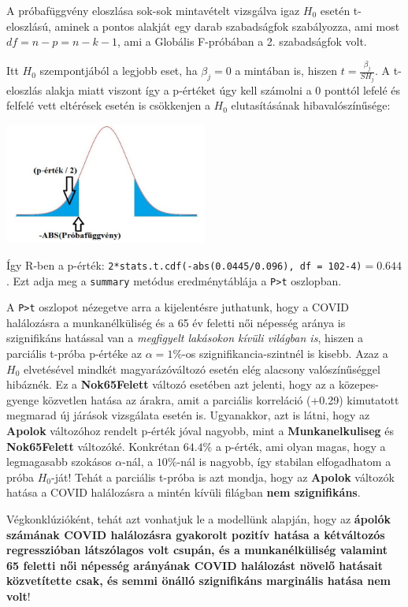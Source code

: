 \documentclass[
]{book}
\begin{document}
A próbafüggvény eloszlása sok-sok mintavételt vizsgálva igaz \(H_0\) esetén t-eloszlású, aminek a pontos alakját egy darab szabadságfok szabályozza, ami most \(df=n-p=n-k-1\), ami a Globális F-próbában a 2. szabadságfok volt.

Itt \(H_0\) szempontjából a legjobb eset, ha \(\beta_j=0\) a mintában is, hiszen \(t=\frac{\beta_j}{SH_j}\). A t-eloszlás alakja miatt viszont így a p-értéket úgy kell számolni a 0 ponttól lefelé és felfelé vett eltérések esetén is csökkenjen a \(H_0\) elutasításának hibavalószínűsége:

\includegraphics[width=0.5\textwidth,height=\textheight]{pt.jpg}

Így R-ben a p-érték: \texttt{2*stats.t.cdf(-abs(0.0445/0.096),\ df\ =\ 102-4)}\(= 0.644\). Ezt adja meg a \texttt{summary} metódus eredménytáblája a \texttt{P\textgreater{}\textbar{}t\textbar{}} oszlopban.

A \texttt{P\textgreater{}\textbar{}t\textbar{}} oszlopot nézegetve arra a kijelentésre juthatunk, hogy a COVID halálozásra a munkanélküliség és a 65 év feletti női népesség aránya is szignifikáns hatással van a \emph{megfigyelt lakásokon kívüli világban is}, hiszen a parciális t-próba p-értéke az \(\alpha=1\%\)-os szignifikancia-szintnél is kisebb. Azaz a \(H_0\) elvetésével mindkét magyarázóváltozó esetén elég alacsony valószínűséggel hibáznék. Ez a \textbf{Nok65Felett} változó esetében azt jelenti, hogy az a közepes-gyenge közvetlen hatása az árakra, amit a parciális korreláció (+0.29) kimutatott megmarad új járások vizsgálata esetén is. Ugyanakkor, azt is látni, hogy az \textbf{Apolok} változóhoz rendelt p-érték jóval nagyobb, mint a \textbf{Munkanelkuliseg} és \textbf{Nok65Felett} változóké. Konkrétan \(64.4\%\) a p-érték, ami olyan magas, hogy a legmagasabb szokásos \(\alpha\)-nál, a \(10\%\)-nál is nagyobb, így stabilan elfogadhatom a próba \(H_0\)-ját! Tehát a parciális t-próba is azt mondja, hogy az \textbf{Apolok} változók hatása a COVID halálozásra a mintén kívüli filágban \textbf{nem szignifikáns}.

Végkonklúzióként, tehát azt vonhatjuk le a modellünk alapján, hogy az \textbf{ápolók számának COVID halálozásra gyakorolt pozitív hatása a kétváltozós regresszióban látszólagos volt csupán, és a munkanélküliség valamint 65 feletti női népesség arányának COVID halálozást növelő hatásait közvetítette csak, és semmi önálló szignifikáns marginális hatása nem volt}!
\end{document}
